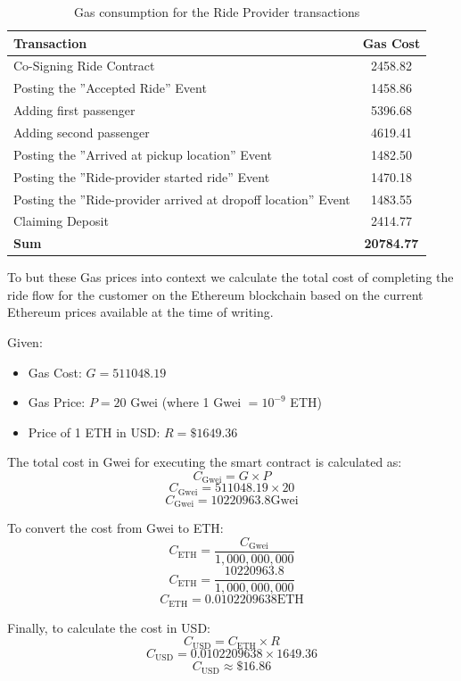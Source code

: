 \begin{table}[H]
\centering
\begin{tabular}{|l|c|}
\hline
\textbf{Transaction} & \textbf{Gas Cost} \\
\hline
Co-Signing Ride Contract & 2458.82 \\
\hline
Posting the ''Accepted Ride'' Event & 1458.86 \\
\hline
Adding first passenger  & 5396.68 \\
\hline
Adding second passenger & 4619.41 \\
\hline
Posting the ''Arrived at pickup location'' Event & 1482.50 \\
\hline
Posting the ''Ride-provider started ride'' Event & 1470.18 \\
\hline
Posting the ''Ride-provider arrived at dropoff location'' Event & 1483.55 \\
\hline
Claiming Deposit & 2414.77 \\
\hline
\hline
\textbf{Sum}  & \textbf{20784.77} \\
\hline
\end{tabular}
\caption{Gas consumption for the Ride Provider transactions}
\label{tab:gasRideProvider}
\end{table}

To but these Gas prices into context we calculate the total cost of completing the ride flow for the customer on the Ethereum blockchain based on the current Ethereum prices available at the time of writing.

Given:
\begin{itemize}
    \item Gas Cost: \( G = 511048.19 \)
    \item Gas Price: \( P = 20 \) Gwei (where 1 Gwei \( = 10^{-9} \) ETH)
    \item Price of 1 ETH in USD: \( R = \$1649.36 \)
\end{itemize}

The total cost in Gwei for executing the smart contract is calculated as:
\[ C_{\text{Gwei}} = G \times P \]
\[ C_{\text{Gwei}} = 511048.19 \times 20 \]
\[ C_{\text{Gwei}} = 10220963.8 \text{Gwei} \]

To convert the cost from Gwei to ETH:
\[ C_{\text{ETH}} = \frac{C_{\text{Gwei}}}{1,000,000,000} \]
\[ C_{\text{ETH}} = \frac{10220963.8}{1,000,000,000} \]
\[ C_{\text{ETH}} = 0.0102209638 \text{ETH} \] 

Finally, to calculate the cost in USD:
\[ C_{\text{USD}} = C_{\text{ETH}} \times R \]
\[ C_{\text{USD}} = 0.0102209638 \times 1649.36 \]
\[ C_{\text{USD}} \approx \$16.86 \]

